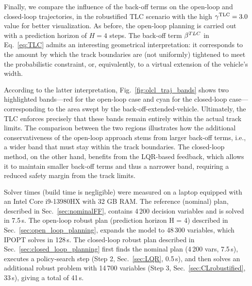 Finally, we compare the influence of the back-off terms on the open-loop and closed-loop trajectories, in the robustified TLC scenario with the high $\gamma^\textrm{TLC}=3.0$ value for better visualization. As before, the open-loop planning is carried out with a prediction horizon of $H=4$ steps.
The back-off term $\beta^{TLC}$ in Eq.~\eqref{eq:TLC} admits an interesting geometrical interpretation: it corresponds to the amount by which the track boundaries are (not uniformly) tightened to meet the probabilistic constraint, or, equivalently, to a virtual extension of the vehicle's width.

According to the latter interpretation, Fig.~\ref{fig:olcl_traj_bands} shows two highlighted bands---red for the open-loop case and cyan for the closed-loop case---corresponding to the area swept by the back-off-extended-vehicle. Ultimately, the TLC enforces precisely that these bands remain entirely within the actual track limits. The comparison between the two regions illustrates how the additional conservativeness of the open-loop approach stems from larger back-off terms, i.e., a wider band that must stay within the track boundaries. The closed-loop method, on the other hand, benefits from the LQR-based feedback, which allows it to maintain smaller back-off terms and thus a narrower band, requiring a reduced safety margin from the track limits.

Solver times (build time is negligible) were measured on a laptop equipped with an Intel Core i9-13980HX with 32 GB RAM.
The reference (nominal) plan, described in Sec.~\ref{sec:nominalFF}, contains 4\,200 decision variables and is solved in 7.5\,s.
The open-loop robust plan (prediction horizon H = 4) described in Sec.~\ref{sec:open_loop_planning}, expands the model to 48\,300 variables, which IPOPT solves in 128\,s.
The closed-loop robust plan described in Sec.~\ref{sec:closed_loop_planning} first finds the nominal plan (4\,200 vars, 7.5\,s), executes a policy-search step (Step 2, Sec.~\ref{sec:LQR}, 0.5\,s), and then solves an additional robust problem with 14\,700 variables (Step 3, Sec.~\ref{sec:CLrobustified}, 33\,s), giving a total of 41\,s.


